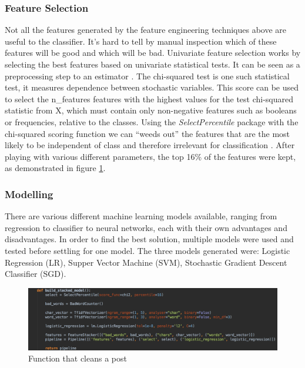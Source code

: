 \subsubsection{Feature Selection}
Not all the features generated by the feature engineering techniques above are useful to the classifier. It's hard to tell by manual inspection which of these features will be good and which will be bad. Univariate feature selection works by selecting the best features based on univariate statistical tests. It can be seen as a preprocessing step to an estimator \cite{Scikit:FeatureSelection}. The chi-squared test is one such statistical test, it measures dependence between stochastic variables. This score can be used to select the n\_features features with the highest values for the test chi-squared statistic from X, which must contain only non-negative features such as booleans or frequencies, relative to the classes. Using the \textit{SelectPercentile} package with the chi-squared scoring function we can ``weeds out'' the features that are the most likely to be independent of class and therefore irrelevant for classification \cite{Scikit:SelectPercentile, Scikit:ChiSquared}. After playing with various different parameters, the top 16\% of the features were kept, as demonstrated in figure \ref{fig:AbuseDetection-Modelling}.

\subsubsection{Modelling}
There are various different machine learning models available, ranging from regression to classifier to neural networks, each with their own advantages and disadvantages. In order to find the best solution, multiple models were used and tested before settling for one model. The three models generated were: Logistic Regression (LR), Supper Vector Machine (SVM), Stochastic Gradient Descent Classifier (SGD).

\begin{figure}[H]
	\centering
	\includegraphics[width=\textwidth]{Images/Implementation/DataProcessing/AbuseDetection/Modelling}
	\caption{Function that cleans a post}
	\label{fig:AbuseDetection-Modelling}
\end{figure}

